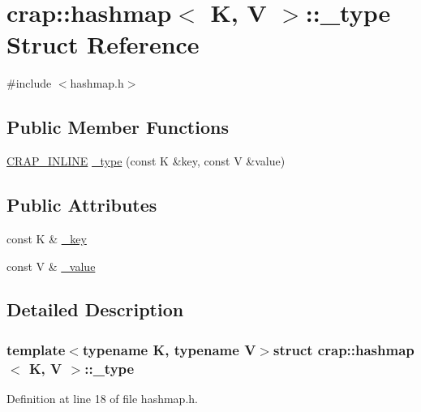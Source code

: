 \hypertarget{structcrap_1_1hashmap_1_1__type}{\section{crap\+:\+:hashmap$<$ K, V $>$\+:\+:\+\_\+type Struct Reference}
\label{structcrap_1_1hashmap_1_1__type}
}


{\ttfamily \#include $<$hashmap.\+h$>$}

\subsection*{Public Member Functions}
\begin{DoxyCompactItemize}
\item 
\hyperlink{config__x86_8h_a5a40526b8d842e7ff731509998bb0f1c}{C\+R\+A\+P\+\_\+\+I\+N\+L\+I\+N\+E} \hyperlink{structcrap_1_1hashmap_1_1__type_a94992f3716e0dacf87e670b9f43248f9}{\+\_\+type} (const K \&key, const V \&value)
\end{DoxyCompactItemize}
\subsection*{Public Attributes}
\begin{DoxyCompactItemize}
\item 
const K \& \hyperlink{structcrap_1_1hashmap_1_1__type_a268f53ecbec536a7eb6251564dea2f06}{\+\_\+key}
\item 
const V \& \hyperlink{structcrap_1_1hashmap_1_1__type_a0cad537a6ca527e20d91bb50d1f8a0f5}{\+\_\+value}
\end{DoxyCompactItemize}


\subsection{Detailed Description}
\subsubsection*{template$<$typename K, typename V$>$struct crap\+::hashmap$<$ K, V $>$\+::\+\_\+type}



Definition at line 18 of file hashmap.\+h.



